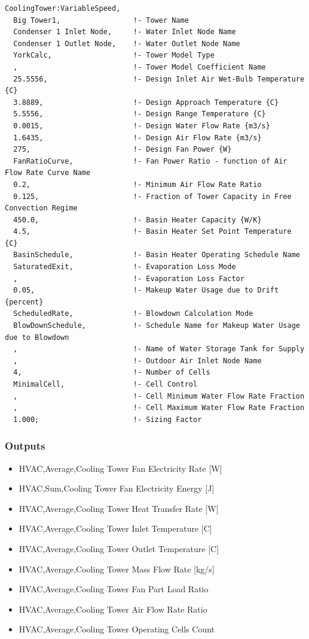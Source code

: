 \begin{lstlisting}
CoolingTower:VariableSpeed,
  Big Tower1,                 !- Tower Name
  Condenser 1 Inlet Node,     !- Water Inlet Node Name
  Condenser 1 Outlet Node,    !- Water Outlet Node Name
  YorkCalc,                   !- Tower Model Type
  ,                           !- Tower Model Coefficient Name
  25.5556,                    !- Design Inlet Air Wet-Bulb Temperature {C}
  3.8889,                     !- Design Approach Temperature {C}
  5.5556,                     !- Design Range Temperature {C}
  0.0015,                     !- Design Water Flow Rate {m3/s}
  1.6435,                     !- Design Air Flow Rate {m3/s}
  275,                        !- Design Fan Power {W}
  FanRatioCurve,              !- Fan Power Ratio - function of Air Flow Rate Curve Name
  0.2,                        !- Minimum Air Flow Rate Ratio
  0.125,                      !- Fraction of Tower Capacity in Free Convection Regime
  450.0,                      !- Basin Heater Capacity {W/K}
  4.5,                        !- Basin Heater Set Point Temperature {C}
  BasinSchedule,              !- Basin Heater Operating Schedule Name
  SaturatedExit,              !- Evaporation Loss Mode
  ,                           !- Evaporation Loss Factor
  0.05,                       !- Makeup Water Usage due to Drift {percent}
  ScheduledRate,              !- Blowdown Calculation Mode
  BlowDownSchedule,           !- Schedule Name for Makeup Water Usage due to Blowdown
  ,                           !- Name of Water Storage Tank for Supply
  ,                           !- Outdoor Air Inlet Node Name
  4,                          !- Number of Cells
  MinimalCell,                !- Cell Control
  ,                           !- Cell Minimum Water Flow Rate Fraction
  ,                           !- Cell Maximum Water Flow Rate Fraction
  1.000;                      !- Sizing Factor
\end{lstlisting}

\subsubsection{Outputs}\label{outputs-3-001}

\begin{itemize}
\item
  HVAC,Average,Cooling Tower Fan Electricity Rate {[}W{]}
\item
  HVAC,Sum,Cooling Tower Fan Electricity Energy {[}J{]}
\item
  HVAC,Average,Cooling Tower Heat Transfer Rate {[}W{]}
\item
  HVAC,Average,Cooling Tower Inlet Temperature {[}C{]}
\item
  HVAC,Average,Cooling Tower Outlet Temperature {[}C{]}
\item
  HVAC,Average,Cooling Tower Mass Flow Rate {[}kg/s{]}
\item
  HVAC,Average,Cooling Tower Fan Part Load Ratio
\item
  HVAC,Average,Cooling Tower Air Flow Rate Ratio
\item
  HVAC,Average,Cooling Tower Operating Cells Count
\end{itemize}

